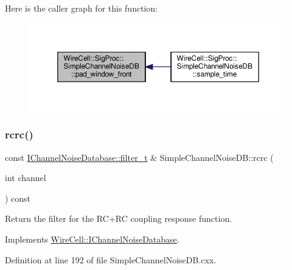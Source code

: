 Here is the caller graph for this function\+:
\nopagebreak
\begin{figure}[H]
\begin{center}
\leavevmode
\includegraphics[width=350pt]{class_wire_cell_1_1_sig_proc_1_1_simple_channel_noise_d_b_a5c1e58cf0586ac32c1e6d3810606a992_icgraph}
\end{center}
\end{figure}
\mbox{\label{class_wire_cell_1_1_sig_proc_1_1_simple_channel_noise_d_b_a9a4481bf485a0aaa4903094463f4e2b3}} 
\subsubsection{\texorpdfstring{rcrc()}{rcrc()}}
{\footnotesize\ttfamily const \hyperlink{class_wire_cell_1_1_i_channel_noise_database_a0acbae29743542eb1c652f7a56e692f5}{I\+Channel\+Noise\+Database\+::filter\+\_\+t} \& Simple\+Channel\+Noise\+D\+B\+::rcrc (\begin{DoxyParamCaption}\item[{int}]{channel }\end{DoxyParamCaption}) const\hspace{0.3cm}{\ttfamily [virtual]}}



Return the filter for the R\+C+\+RC coupling response function. 



Implements \hyperlink{class_wire_cell_1_1_i_channel_noise_database_a8f9fa5547062c23f689fde9bb810361b}{Wire\+Cell\+::\+I\+Channel\+Noise\+Database}.



Definition at line 192 of file Simple\+Channel\+Noise\+D\+B.\+cxx.

